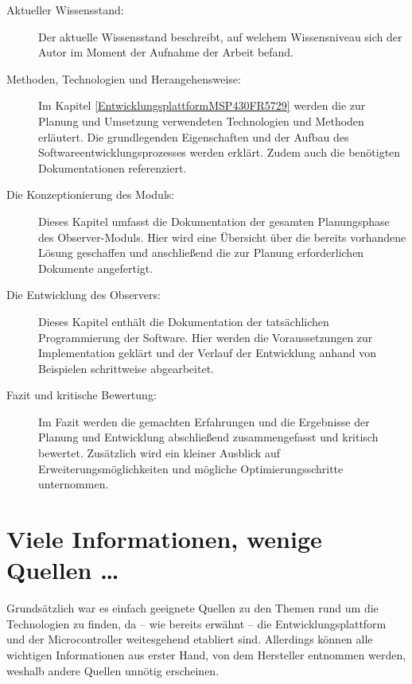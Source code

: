 \begin{description}

	\item[Aktueller Wissensstand:] Der aktuelle Wissensstand beschreibt, auf welchem Wissensniveau sich der Autor im Moment der Aufnahme der Arbeit befand.
	
	\item[Methoden, Technologien und Herangehensweise:] Im Kapitel \ref{EntwicklungsplattformMSP430FR5729} werden die zur Planung und Umsetzung verwendeten Technologien und Methoden erl\"autert. Die grundlegenden Eigenschaften und der Aufbau des Softwareentwicklungsprozesses werden erkl\"art. Zudem auch die ben\"otigten Dokumentationen referenziert.
	
	\item[Die Konzeptionierung des Moduls:] Dieses Kapitel umfasst die Dokumentation der gesamten Planungsphase des Observer-Moduls. Hier wird eine \"Ubersicht \"uber die bereits vorhandene L\"osung geschaffen und anschlie{\ss}end die zur Planung erforderlichen Dokumente angefertigt.
	
	\item[Die Entwicklung des Observers:] Dieses Kapitel enth\"alt die Dokumentation der tats\"achlichen Programmierung der Software. Hier werden die Voraussetzungen zur Implementation gekl\"art und der Verlauf der Entwicklung anhand von Beispielen schrittweise abgearbeitet.
	
	\item[Fazit und kritische Bewertung:] Im Fazit werden die gemachten Erfahrungen und die Ergebnisse der Planung und Entwicklung abschlie{\ss}end zusammengefasst und kritisch bewertet. Zus\"atzlich wird ein kleiner Ausblick auf Erweiterungsm\"oglichkeiten und m\"ogliche Optimierungsschritte unternommen.

\end{description}


\section{Viele Informationen, wenige Quellen \dots}
\label{sec:Quellenlage}

Grunds\"atzlich war es einfach geeignete Quellen zu den Themen rund um die Technologien zu finden, da -- wie bereits erw\"ahnt -- die Entwicklungsplattform und der Microcontroller weitesgehend etabliert sind. Allerdings k\"onnen alle wichtigen Informationen aus erster Hand, von dem Hersteller entnommen werden, weshalb andere Quellen unn\"otig erscheinen.